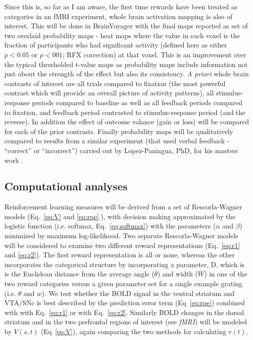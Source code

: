 \documentclass[doc,12pt]{apa}        %
\begin{document}
Since this is, so far as I am aware, the first time rewards have been treated as categories in an fMRI experiment, whole brain activation mapping is also of interest.  This will be done in BrainVoyager with the final maps reported as set of two overlaid probability maps - heat maps where the value in each voxel is the fraction of participants who had significant activity (defined here as either $p < 0.05$ or $p < 001$; RFX correction) at that voxel.   This is an improvement over the typical thresholded t-value maps as probability maps include information not just about the strength of the effect but also its consistency.  \emph{A priori} whole brain contrasts of interest are all trials compared to fixation (the most powerful contrast which will provide an overall picture of activity patterns), all stimulus-response periods compared to baseline as well as all feedback periods compared to fixation, and feedback period contrasted to stimulus-response period (and the reverse). In addition the effect of outcome valance (gain or loss) will be compared for each of the prior contrasts.  Finally probability maps will be qualitatively compared to results from a similar experiment (that used verbal feedback - ``correct'' or ``incorrect'') carried out by Lopez-Paniagua, PhD, for his masters work \cite{LopezPaniagua:2011p8296}. 

\subsection{Computational analyses} %
\label{sub:Computational}
Reinforcement learning measures will be derived from a set of Rescorla-Wagner models (Eq.~\ref{eq:V} and \ref{eq:rpe}.), with decision making approximated by the logistic function (i.e. softmax, Eq.~\ref{eq:softmax}) with the parameters ($\alpha$ and $\beta$) minimized by maximum log-likelihood.  Two separate Rescorla-Wagner models will be considered to examine two different reward representations (Eq.~\ref{eq:r1} and \ref{eq:r2}).  The first reward representation is all or none, whereas the other incorporates the categorical structure by incorporating a parameter, D, which is is the Euclidean distance from the average angle ($\bar{\theta}$) and width ($\bar{W}$) in one of the two reward categories versus a given parameter set for a single example grating (i.e. $\theta$ and $w$).   We test whether the BOLD signal in the ventral striatum and VTA/SNc is best described by the prediction error term (Eq~\ref{eq:rpe}) combined with with Eq.~\ref{eq:r1} or with Eq.~\ref{eq:r2}.    Similarly BOLD changes in the dorsal striatum and in the two prefrontal regions of interest (see \emph{fMRI}) will be modeled by $V(s,t)$ (Eq~\ref{eq:V}), again comparing the two methods for calculating $r(t)$.
\end{document}
